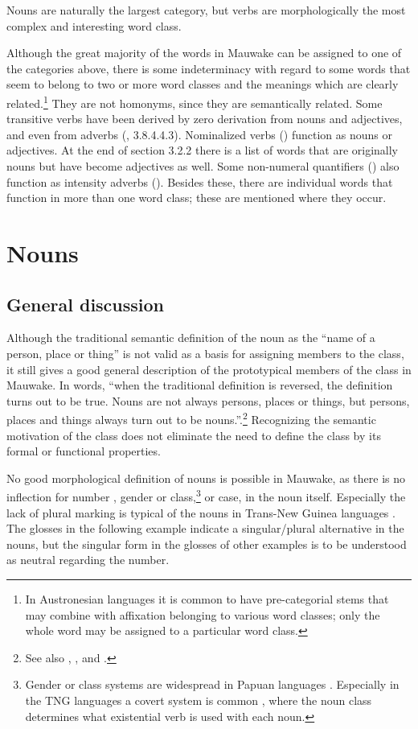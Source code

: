 Nouns are naturally the largest category, but verbs are morphologically the most complex and interesting word class.

Although the great majority of the words in Mauwake can be assigned to one of the categories above, there is some indeterminacy with regard to some words that seem to belong to two or more word classes and the meanings which are clearly related.\footnote{In Austronesian languages it is common to have pre-categorial stems that may combine with affixation belonging to various word classes; only the whole word may be assigned to a particular word class.} They are not homonyms, since they are semantically related. Some transitive verbs have been derived by zero derivation from nouns and adjectives, and even from adverbs (, 3.8.4.4.3). Nominalized verbs () function as nouns or adjectives. At the end of section 3.2.2 there is a list of words that are originally nouns but have become adjectives as well. Some non-numeral quantifiers () also function as intensity adverbs (). Besides these, there are individual words that function in more than one word class; these are mentioned where they occur.

\section{Nouns}\label{sec:3.2}
{}
\subsection{General discussion}\label{sec:3:2:1}
{}
Although the traditional semantic definition of the noun as the ``name of a person, place or thing'' is not valid as a basis for assigning members to the class, it still gives a good general description of the prototypical members of the class in Mauwake. In  words, ``when the traditional definition is reversed, the definition turns out to be true. Nouns are not always persons, places or things, but persons, places and things always turn out to be nouns.''.\footnote{See also \citet[117]{Sapir1921}, \citet[60]{Jespersen1924}, \citet[449]{Lyons1977} and \citet[7]{Schachter1985}.} Recognizing the semantic motivation of the class does not eliminate the need to define the class by its formal or functional properties.

No good morphological definition of nouns is possible in Mauwake, as there is no inflection for number , gender or class,\footnote{Gender or class systems are widespread in Papuan languages \citep[77]{Foley1986}. Especially in the \textsc{TNG} languages a covert system is common \citep[58]{Wurm1982}, where the noun class determines what existential verb is used with each noun.} or case, in the noun itself. Especially the lack of plural marking is typical of the nouns in Trans-New Guinea languages \citep[36]{Wurm1982}. The glosses in the following example indicate a singular/plural alternative in the nouns, but the singular form in the glosses of other examples is to be understood as neutral regarding the number. 

